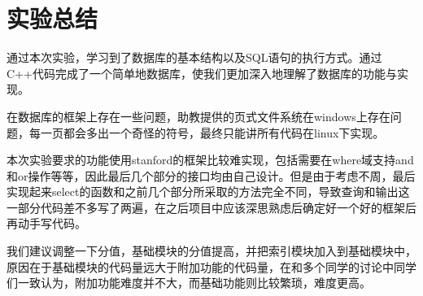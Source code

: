 
\chapter{实验总结} %

\label{Chapter6} %

通过本次实验，学习到了数据库的基本结构以及SQL语句的执行方式。通过C++代码完成了一个简单地数据库，使我们更加深入地理解了数据库的功能与实现。

在数据库的框架上存在一些问题，助教提供的页式文件系统在windows上存在问题，每一页都会多出一个奇怪的符号，最终只能讲所有代码在linux下实现。

本次实验要求的功能使用stanford的框架比较难实现，包括需要在where域支持and和or操作等等，因此最后几个部分的接口均由自己设计。但是由于考虑不周，最后实现起来select的函数和之前几个部分所采取的方法完全不同，导致查询和输出这一部分代码差不多写了两遍，在之后项目中应该深思熟虑后确定好一个好的框架后再动手写代码。

我们建议调整一下分值，基础模块的分值提高，并把索引模块加入到基础模块中，原因在于基础模块的代码量远大于附加功能的代码量，在和多个同学的讨论中同学们一致认为，附加功能难度并不大，而基础功能则比较繁琐，难度更高。